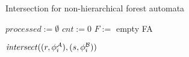 \begin{algorithm}[ht]
  \caption{Intersection for non-hierarchical forest automata}
\label{alg:isect}

  $\mathit{processed} := \emptyset$\;
  $\mathit{cnt} := 0$\;
  $\mathit{F} :=$ empty FA\;
  
  {
	{
		{
			$\mathit{intersect}((r,\phi_{i}^{\mathcal{A}}),(s,\phi_{i}^{\mathcal{B}}))$\;
		}
	}
  }

  \;
\end{algorithm}

